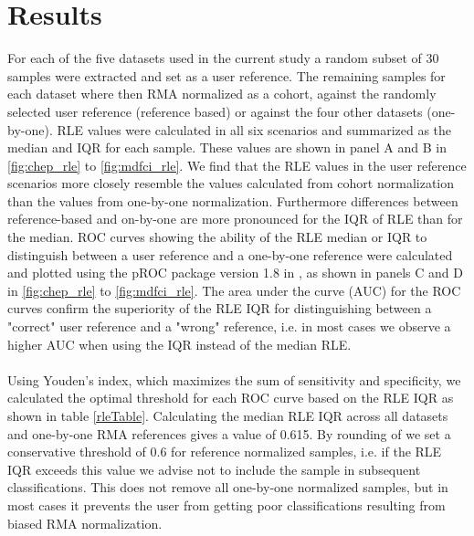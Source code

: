 \documentclass{article}
\begin{document}
\section{Results}
For each of the five datasets used in the current study a random subset of 30 samples were extracted and set as a user reference. The remaining samples for each dataset where then RMA normalized as a cohort, against the randomly selected user reference (reference based) or against the four other datasets (one-by-one). RLE values were calculated in all six scenarios and summarized as the median and IQR for each sample. These values are shown in panel A and B in \cref{fig:chep_rle} to \cref{fig:mdfci_rle}. We find that the RLE values in the user reference scenarios more closely resemble the values calculated from cohort normalization than the values from one-by-one normalization. Furthermore differences between reference-based and on-by-one are more pronounced for the IQR of RLE than for the median. ROC curves showing the ability of the RLE median or IQR to distinguish between a user reference and a one-by-one reference were calculated and plotted using the pROC package version 1.8 \citep{Robin2011} in \R, as shown in panels C and D in \cref{fig:chep_rle} to \cref{fig:mdfci_rle}. The area under the curve (AUC) for the ROC curves confirm the superiority of the RLE IQR for distinguishing between a "correct" user reference and a "wrong" reference, i.e. in most cases we observe a higher AUC when using the IQR instead of the median RLE.\\\\
Using Youden's index, which maximizes the sum of sensitivity and specificity, we calculated the optimal threshold for each ROC curve based on the RLE IQR as shown in table \ref{rleTable}. Calculating the median RLE IQR across all datasets and one-by-one RMA references gives a value of 0.615. By rounding of we set a conservative threshold of 0.6 for reference normalized samples, i.e. if the RLE IQR exceeds this value we advise not to include the sample in subsequent classifications. This does not remove all one-by-one normalized samples, but in most cases it prevents the user from getting poor classifications resulting from biased RMA normalization.
\end{document}
